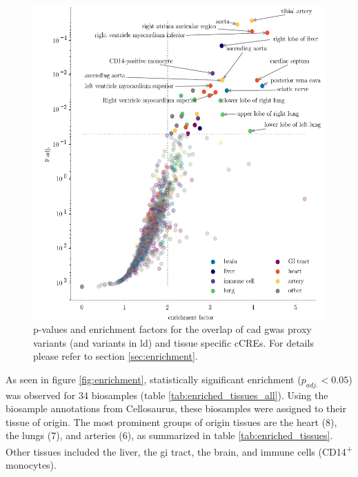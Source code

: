 \begin{figure}[h!]
\capstart
    \centering
	\includegraphics{Abbildung/enrichment_scatter.pdf}

	\begin{minipage}{\captionwidth}
		\caption[enrichemtn]{ \newline p-values and enrichment factors for the overlap of \ac{cad} \ac{gwas} proxy variants (and variants in \ac{ld}) and tissue specific \acp{cCRE}. For details please refer to section \ref{sec:enrichment}.}
		\label{fig:enrichment_scatter}
	\end{minipage}
\end{figure}

As seen in figure \ref{fig:enrichment}, statistically significant enrichment ($p_{adj.}<0.05$) was observed for 34 biosamples (table \ref{tab:enriched_tissues_all}). Using the biosample annotations from Cellosaurus, these biosamples were assigned to their tissue of origin. The most prominent groups of origin tissues are the heart (8), the lungs (7), and arteries (6), as summarized in table \ref{tab:enriched_tissues}. Other tissues included the liver, the \ac{gi} tract, the brain, and immune cells (CD14\textsuperscript{+} monocytes).


